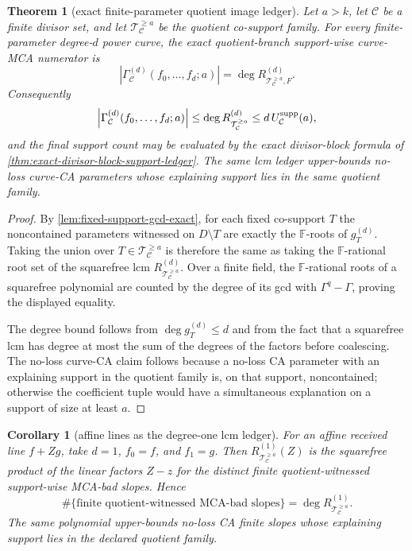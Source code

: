 \documentclass[11pt]{article}
\newtheorem{theorem}{Theorem}[section]
\newtheorem{corollary}[corollary]{Corollary}
\theoremstyle{definition}
\theoremstyle{remark}
\newcommand{\F}{\mathbb{F}}
\begin{document}
\begin{theorem}[exact finite-parameter quotient image ledger]
\label{thm:exact-quotient-image-lcm-ledger}
Let $a>k$, let $\mathcal C$ be a finite divisor set, and let
$\mathcal T_{\mathcal C}^{\ge a}$ be the quotient co-support family.  For every
finite-parameter degree-$d$ power curve, the exact quotient-branch support-wise
curve-MCA numerator is
\[
        \boxed{
        \left|\Gamma_{\mathcal C}^{(d)}(f_0,\ldots,f_d;a)\right|
        =\deg R_{\mathcal T_{\mathcal C}^{\ge a},F}^{(d)} .
        }
\]
Consequently
\[
        \left|\Gamma_{\mathcal C}^{(d)}(f_0,\ldots,f_d;a)\right|
        \le \deg R_{\mathcal T_{\mathcal C}^{\ge a}}^{(d)}
        \le d\,U_{\mathcal C}^{\rm supp}(a),
\]
and the final support count may be evaluated by the exact divisor-block formula
of \cref{thm:exact-divisor-block-support-ledger}.  The same lcm ledger
upper-bounds no-loss curve-CA parameters whose explaining support lies in the
same quotient family.
\end{theorem}

\begin{proof}
By \cref{lem:fixed-support-gcd-exact}, for each fixed co-support $T$ the
noncontained parameters witnessed on $D\setminus T$ are exactly the $\F$-roots of
$g_T^{(d)}$.  Taking the union over
$T\in\mathcal T_{\mathcal C}^{\ge a}$ is therefore the same as taking the
$\F$-rational root set of the squarefree lcm
$R_{\mathcal T_{\mathcal C}^{\ge a}}^{(d)}$.  Over a finite field, the
$\F$-rational roots of a squarefree polynomial are counted by the degree of its
gcd with $\Gamma^q-\Gamma$, proving the displayed equality.

The degree bound follows from $\deg g_T^{(d)}\le d$ and from the fact that a
squarefree lcm has degree at most the sum of the degrees of the factors before
coalescing.  The no-loss curve-CA claim follows because a no-loss CA parameter
with an explaining support in the quotient family is, on that support,
noncontained; otherwise the coefficient tuple would have a simultaneous
explanation on a support of size at least $a$.
\end{proof}

\begin{corollary}[affine lines as the degree-one lcm ledger]
\label{cor:affine-line-lcm-ledger}
For an affine received line $f+Zg$, take $d=1$, $f_0=f$, and $f_1=g$.  Then
$R_{\mathcal T_{\mathcal C}^{\ge a}}^{(1)}(Z)$ is the squarefree product of the
linear factors $Z-z$ for the distinct finite quotient-witnessed support-wise
MCA-bad slopes.  Hence
\[
        \#\{\text{finite quotient-witnessed MCA-bad slopes}\}
        =\deg R_{\mathcal T_{\mathcal C}^{\ge a}}^{(1)} .
\]
The same polynomial upper-bounds no-loss CA finite slopes whose explaining
support lies in the declared quotient family.
\end{corollary}
\end{document}

